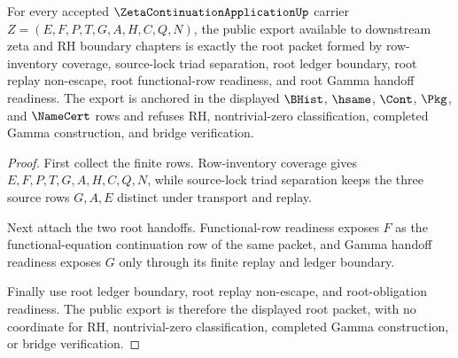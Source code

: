 \begin{theorem}
\label{thm:zeta-continuation-application-root-public-export-readiness}
For every accepted $\ZetaContinuationApplicationUp$ carrier
$Z=(E,F,P,T,G,A,H,C,Q,N)$, the public export available to downstream zeta and
RH boundary chapters is exactly the root packet formed by row-inventory
coverage, source-lock triad separation, root ledger boundary, root replay
non-escape, root functional-row readiness, and root Gamma handoff readiness.
The export is anchored in the displayed $\BHist$, $\hsame$, $\Cont$, $\Pkg$,
and $\NameCert$ rows and refuses RH, nontrivial-zero classification, completed
Gamma construction, and bridge verification.
\end{theorem}
\begin{proof}
First collect the finite rows. Row-inventory coverage gives
$E,F,P,T,G,A,H,C,Q,N$, while source-lock triad separation keeps the three source
rows $G,A,E$ distinct under transport and replay.

Next attach the two root handoffs. Functional-row readiness exposes $F$ as the
functional-equation continuation row of the same packet, and Gamma handoff
readiness exposes $G$ only through its finite replay and ledger boundary.

Finally use root ledger boundary, root replay non-escape, and root-obligation
readiness. The public export is therefore the displayed root packet, with no
coordinate for RH, nontrivial-zero classification, completed Gamma
construction, or bridge verification.
\end{proof}

